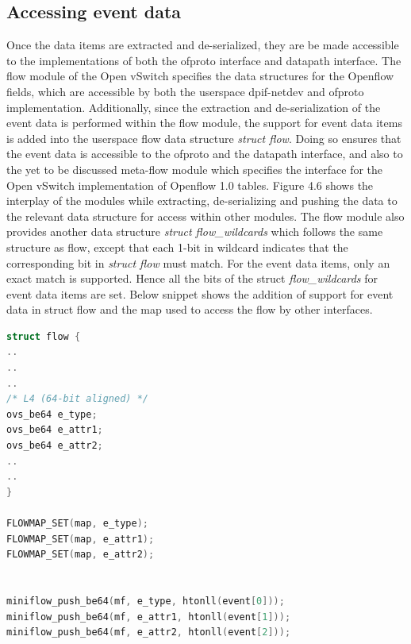 \subsection{Accessing event data}
Once the data items are extracted and de-serialized, they are be made accessible to the implementations of both the ofproto interface and datapath interface. The flow module of the Open vSwitch specifies the data structures for the Openflow fields, which are accessible by both the userspace dpif-netdev and ofproto implementation. Additionally, since the extraction and de-serialization of the event data is performed within the flow module, the support for event data items is added into the userspace flow data structure \textit{struct flow}. Doing so ensures that the event data is accessible to the ofproto and the datapath interface, and also to the yet to be discussed meta-flow module which specifies the interface for the Open vSwitch implementation of Openflow 1.0 tables. Figure 4.6 shows the interplay of the modules while extracting, de-serializing and pushing the data to the relevant data structure for access within other modules. The flow module also provides another data structure \textit{struct flow_wildcards} which follows the same structure as flow, except that each 1-bit in wildcard indicates that the corresponding bit in \textit{struct flow} must match. For the event data items, only an exact match is supported. Hence all the bits of the struct \textit{flow_wildcards} for event data items are set. Below snippet shows the addition of support for event data in struct flow and the map used to access the flow by other interfaces. \newline

\begin{lstlisting}[language=c]
struct flow {
..
..
..
/* L4 (64-bit aligned) */
ovs_be64 e_type;
ovs_be64 e_attr1;
ovs_be64 e_attr2;
..
..
}

FLOWMAP_SET(map, e_type);  
FLOWMAP_SET(map, e_attr1);  
FLOWMAP_SET(map, e_attr2);  


miniflow_push_be64(mf, e_type, htonll(event[0]));                   
miniflow_push_be64(mf, e_attr1, htonll(event[1]));
miniflow_push_be64(mf, e_attr2, htonll(event[2]));
\end{lstlisting}



